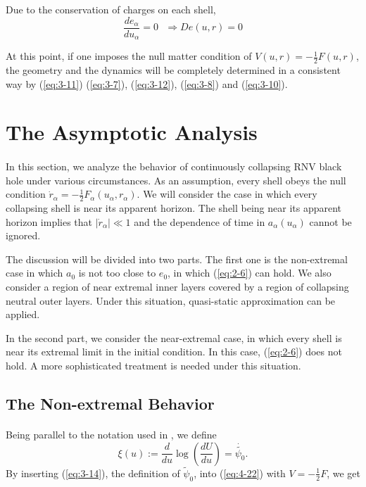 \documentclass[letterpaper,12pt]{article}
\begin{document}
Due to the conservation of charges on each shell,
\begin{equation}\label{eq:3-10}
\frac{de_{\alpha}}{du_{\alpha}} = 0 \textrm{ } \Rightarrow De(u, r) = 0
\end{equation}

At this point, if one imposes the null matter condition of $V(u,r) = -\frac{1}{2}F(u,r)$, the geometry and the dynamics will be completely determined in a consistent way by (\ref{eq:3-11}) (\ref{eq:3-7}), (\ref{eq:3-12}), (\ref{eq:3-8}) and (\ref{eq:3-10}).

\section{The Asymptotic Analysis}\label{sec:4}
\paragraph{ }
In this section, we analyze the behavior of continuously collapsing RNV black hole under various circumstances. As an assumption, every shell obeys the null condition $\dot{r}_{\alpha} = -\frac{1}{2}F_{\alpha}(u_{\alpha},r_{\alpha})$. We will consider the case in which every collapsing shell is near its apparent horizon.  The shell being near its apparent horizon implies that $|\dot{r}_{\alpha}| \ll 1$ and the dependence of time in $a_{\alpha}(u_{\alpha})$ cannot be ignored. 

The discussion will be divided into two parts. The first one is the non-extremal case in which $a_{0}$ is not too close to $e_{0}$, in which (\ref{eq:2-6}) can hold. We also consider a region of near extremal inner layers covered by a region of collapsing neutral outer layers. Under this situation, quasi-static approximation can be applied. 

In the second part, we consider the near-extremal case, in which every shell is near its extremal limit in the initial condition. In this case, (\ref{eq:2-6}) does not hold. A more sophisticated treatment is needed under this situation. 

\subsection{The Non-extremal Behavior}\label{sec:4-1}
\paragraph{ }
Being parallel to the notation used in \cite{kawai2013self}, we define
\begin{equation} \label{eq:4-22}
\xi(u) := \frac{d}{du}\log(\frac{dU}{du}) = \dot{\tilde{\psi_{0}}} .
\end{equation}
By inserting (\ref{eq:3-14}), the definition of $\tilde{\psi}_{0}$, into (\ref{eq:4-22}) with $V = -\frac{1}{2}F$, we get
\end{document}
